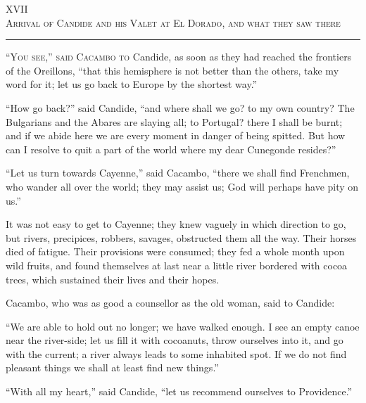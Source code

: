 \begin{center}
XVII\\
\textsc{Arrival of Candide and his Valet at El Dorado, and what they saw there}
\end{center}
\vspace{-0.5cm}
\rule{\textwidth}{0.5pt}
\lettrine{``Y}{ou see,'' said Cacambo to} Candide, as soon as they had reached the frontiers of the Oreillons, ``that this hemisphere is not better than the others, take my word for it; let us go back to Europe by the shortest way.''

``How go back?'' said Candide, ``and where shall we go? to my own country? The Bulgarians and the Abares are slaying all; to Portugal? there I shall be burnt; and if we abide here we are every moment in danger of being spitted. But how can I resolve to quit a part of the world where my dear Cunegonde resides?''

``Let us turn towards Cayenne,'' said Cacambo, ``there we shall find Frenchmen, who wander all over the world; they may assist us; God will perhaps have pity on us.''

It was not easy to get to Cayenne; they knew vaguely in which direction to go, but rivers, precipices, robbers, savages, obstructed them all the way. Their horses died of fatigue. Their provisions were consumed; they fed a whole month upon wild fruits, and found themselves at last near a little river bordered with cocoa trees, which sustained their lives and their hopes.

Cacambo, who was as good a counsellor as the old woman, said to Candide:

``We are able to hold out no longer; we have walked enough. I see an empty canoe near the river-side; let us fill it with cocoanuts, throw ourselves into it, and go with the current; a river always leads to some inhabited spot. If we do not find pleasant things we shall at least find new things.''

``With all my heart,'' said Candide, ``let us recommend ourselves to Providence.''

